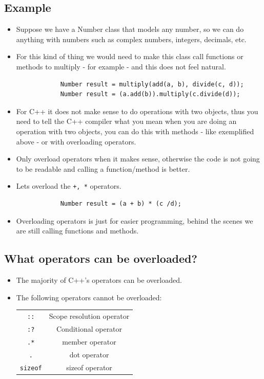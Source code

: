 \subsection{Example}
\begin{itemize}
    \item Suppose we have a Number class that models any number, so we can do anything with numbers such as complex numbers, integers, decimals, etc.
    \item For this kind of thing we would need to make this class call functions or methods to multiply - for example - and this does not feel natural.
        \begin{verbatim}
            Number result = multiply(add(a, b), divide(c, d));
            Number result = (a.add(b)).multiply(c.divide(d));
        \end{verbatim}
    
    \item For C++ it does not make sense to do operations with two objects, thus you need to tell the C++ compiler what you mean when you are doing an operation with two objects, you can do this with methods - like exemplified above - or with overloading operators.
    \item Only overload operators when it makes sense, otherwise the code is not going to be readable and calling a function/method is better.
    \item Lets overload the \verb|+, *| operators.
        \begin{verbatim}
            Number result = (a + b) * (c /d);
        \end{verbatim}
    
    \item Overloading operators is just for easier programming, behind the scenes we are still calling functions and methods. 
\end{itemize}

\subsection{What operators can be overloaded?}
\begin{itemize}
    \item The majority of C++'s operators can be overloaded.
    \item The following operators cannot be overloaded:
        \begin{center}
            \begin{tabular}{ |c|c| }
                \hline
                    \texttt{::} & Scope resolution operator \\
                    \texttt{:?} & Conditional operator \\
                    \texttt{.*} & member operator \\
                    \texttt{.} & dot operator \\
                    \texttt{sizeof} & sizeof operator \\
                \hline
            \end{tabular}
        \end{center}
\end{itemize}

